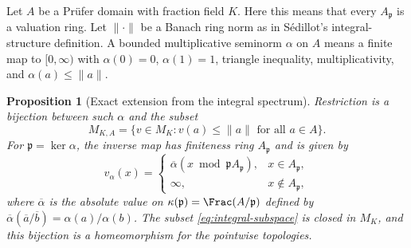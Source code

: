 \documentclass[11pt,a4paper]{article}
\newtheorem{proposition}[theorem]{Proposition}
\theoremstyle{definition}\newtheorem{definition}[theorem]{Definition}
\begin{document}
Let $A$ be a Pr\"ufer domain with fraction field $K$. Here this means that
every $A_{\mathfrak p}$ is a valuation ring. Let $\|\cdot\|$ be a Banach
ring norm as in S\'edillot's integral-structure definition. A bounded
multiplicative seminorm $\alpha$ on $A$ means a finite map to
$[0,\infty)$ with $\alpha(0)=0$, $\alpha(1)=1$, triangle inequality,
multiplicativity, and $\alpha(a)\le\|a\|$.

\begin{proposition}[Exact extension from the integral spectrum]
\label{prop:integral}
Restriction is a bijection between such $\alpha$ and the subset
\[
 M_{K,A}=\{v\in M_K:v(a)\le\|a\|\text{ for all }a\in A\}.
 \tag{AV4.1}\label{eq:integral-subspace}
\]
For $\mathfrak p=\ker\alpha$, the inverse map has finiteness ring
$A_{\mathfrak p}$ and is given by
\[
 v_\alpha(x)=
 \begin{cases}
  \overline\alpha(x\bmod\mathfrak p A_{\mathfrak p}),&x\in A_{\mathfrak p},\\
  \infty,&x\notin A_{\mathfrak p},
 \end{cases}
 \tag{AV4.2}\label{eq:extension}
\]
where $\overline\alpha$ is the absolute value on
$\kappa(\mathfrak p)=\Frac(A/\mathfrak p)$ defined by
$\overline\alpha(\overline a/\overline b)=\alpha(a)/\alpha(b)$.
The subset \eqref{eq:integral-subspace} is closed in $M_K$, and this
bijection is a homeomorphism for the pointwise topologies.
\end{proposition}
\end{document}
